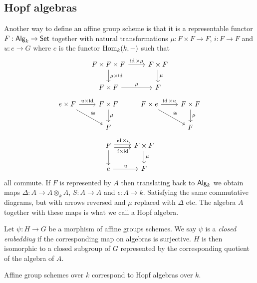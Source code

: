 \documentclass{memoir}
\begin{document}
\subsection{Hopf algebras}
Another way to define an affine group scheme is that it is a representable functor $F:{\normalfont\mathsf{Alg}}_k \to {\normalfont\mathsf{Set}}$ together with natural transformations $\mu:F\times F\to F$, $i:F\to F$ and $u:e\to G$ where $e$ is the functor $\operatorname{Hom}_k(k,-)$ such that
\begin{equation}
    \begin{tikzcd}
        F\times F\times F \arrow[r,"\id\times\mu"] \arrow[d,"\mu\times\id"] & F\times F \arrow[d,"\mu"] \\
        F\times F \arrow[r,"\mu"] & F
    \end{tikzcd}
\end{equation}
\begin{equation}
    \begin{tikzcd}
        e\times F \arrow[r,"u\times\id"] \arrow[dr,"\cong"] & F\times F \arrow[d,"\mu"] & F\times e \arrow[r,"\id\times u"] \arrow[dr,"\cong"] & F\times F \arrow[d,"\mu"] \\
                                                            & F & & F
    \end{tikzcd}
\end{equation}
\begin{equation}
    \begin{tikzcd}
        F \arrow[r,shift right,swap,"i\times\id"] \arrow[r,shift left,"\id\times i"] \arrow[d] & F\times F \arrow[d,"\mu"] \\
        e \arrow[r,"u"] & F
    \end{tikzcd}
\end{equation}
all commute.
If $F$ is represented by $A$ then translating back to ${\normalfont\mathsf{Alg}}_k$ we obtain maps $\Delta:A\to A\otimes_k A$, $S:A\to A$ and $\epsilon:A\to k$.
Satisfying the same commutative diagrams, but with arrows reversed and $\mu$ replaced with $\Delta$ etc.
The algebra $A$ together with these maps is what we call a Hopf algebra.
\begin{definition}
    Let $\psi:H\to G$ be a morphism of affine groups schemes. 
    We say $\psi$ is a \textit{closed embedding} if the corresponding map on algebras is surjective.
    $H$ is then isomorphic to a closed subgroup of $G$ represented by the corresponding quotient of the algebra of $A$.
\end{definition}
\begin{thm}
    Affine group schemes over $k$ correspond to Hopf algebras over $k$.
\end{thm}
\end{document}
